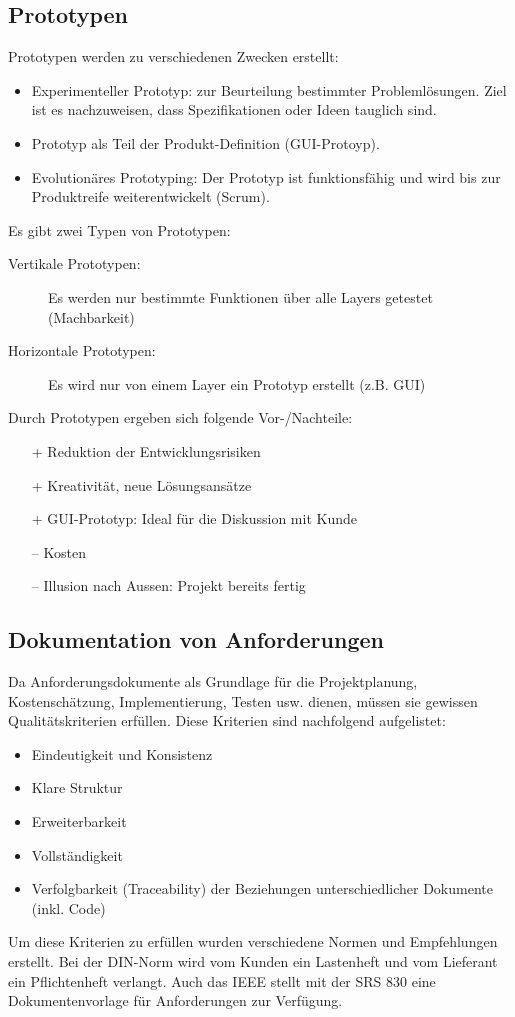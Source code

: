 \subsection{Prototypen}

Prototypen werden zu verschiedenen Zwecken erstellt:
\begin{itemize}
	\item Experimenteller Prototyp: zur Beurteilung bestimmter Problemlösungen. Ziel ist es nachzuweisen, dass Spezifikationen oder Ideen tauglich sind.
	\item Prototyp als Teil der Produkt-Definition (GUI-Protoyp).
	\item Evolutionäres Prototyping: Der Prototyp ist funktionsfähig und wird bis zur Produktreife weiterentwickelt (Scrum). 
\end{itemize}
Es gibt zwei Typen von Prototypen:
\begin{description}
	\item[Vertikale Prototypen:] Es werden nur bestimmte Funktionen über alle Layers getestet (Machbarkeit)
	\item[Horizontale Prototypen:] Es wird nur von einem Layer ein Prototyp erstellt (z.B. GUI)
\end{description}
Durch Prototypen ergeben sich folgende Vor-/Nachteile:
\begin{itemize}
	\item[+] Reduktion der Entwicklungsrisiken
	\item[+] Kreativität, neue Lösungsansätze
	\item[+] GUI-Prototyp: Ideal für die Diskussion mit Kunde
	\item[--] Kosten
	\item[--] Illusion nach Aussen: Projekt bereits fertig
\end{itemize}

\subsection{Dokumentation von Anforderungen}

Da Anforderungsdokumente als Grundlage für die Projektplanung, Kostenschätzung, Implementierung, Testen usw. dienen, müssen sie gewissen Qualitätskriterien erfüllen. Diese Kriterien sind nachfolgend aufgelistet:
\begin{itemize}
	\item Eindeutigkeit und Konsistenz
	\item Klare Struktur
	\item Erweiterbarkeit
	\item Vollständigkeit
	\item Verfolgbarkeit (Traceability) der Beziehungen unterschiedlicher Dokumente (inkl. Code)
\end{itemize}
Um diese Kriterien zu erfüllen wurden verschiedene Normen und Empfehlungen erstellt. Bei der DIN-Norm wird vom Kunden ein Lastenheft und vom Lieferant ein Pflichtenheft verlangt. Auch das IEEE stellt mit der SRS 830 eine Dokumentenvorlage für Anforderungen zur Verfügung.

